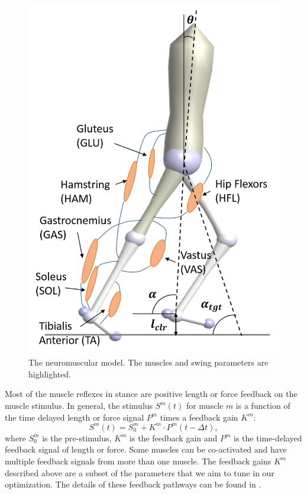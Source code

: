 \begin{figure}[t]
    \centering
    \includegraphics[height=0.3\textheight]{img/nmm_pic.png}
    \caption{The neuromuscular model. The muscles and swing parameters are highlighted.}
    \label{fig_nmm}
\end{figure}

Most of the muscle reflexes in stance are positive length or force feedback on the muscle stimulus. In general, the stimulus $S^m(t)$ for muscle $m$ is a function of the time delayed length or force signal $P^m$ times a feedback gain $K^m$:
\begin{equation*}
S^m(t) =  S_0^m + K^m \cdot P^m(t - \Delta t),
\end{equation*}
where $S_0^m$ is the pre-stimulus, $K^m$ is the feedback gain and $P^m$ is the time-delayed feedback signal of length or force. Some muscles can be co-activated and have multiple feedback signals from more than one muscle. The feedback gains $K^m$ described above are a subset of the parameters that we aim to tune in our optimization. The details of these feedback pathways can be found in \cite{song2015neural}.

